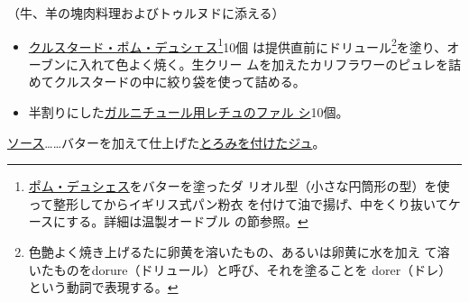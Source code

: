 \begin{recette}


（牛、羊の塊肉料理およびトゥルヌドに添える）

\begin{itemize}
\item
  \protect\hyperlink{croustade-en-pomme-duchesse}{クルスタード・ポム・デュシェス}\footnote{\protect\hyperlink{pomme-de-terre-duchesse}{ポム・デュシェス}をバターを塗ったダ
    リオル型（小さな円筒形の型）を使って整形してからイギリス式パン粉衣
    を付けて油で揚げ、中をくり抜いてケースにする。詳細は温製オードブル
    の節参照。}10個 は提供直前にドリュール\footnote{色艶よく焼き上げるたに卵黄を溶いたもの、あるいは卵黄に水を加え
    て溶いたものをdorure（ドリュール）と呼び、それを塗ることを
    dorer（ドレ）という動詞で表現する。}を塗り、オーブンに入れて色よく焼く。生クリー
  ムを加えたカリフラワーのピュレを詰めてクルスタードの中に絞り袋を使って詰める。
\item
  半割りにした\protect\hyperlink{laitues-farcies-pour-garniture}{ガルニチュール用レチュのファル
  シ}10個。
\end{itemize}

\ul{ソース}\ldots{}\ldots{}バターを加えて仕上げた\protect\hyperlink{jus-de-veau-lie}{とろみを付けたジュ}。
\end{recette}